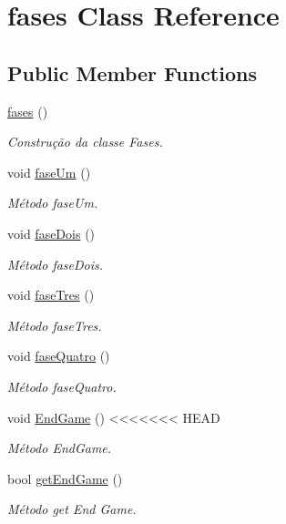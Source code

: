 \hypertarget{classfases}{}\section{fases Class Reference}
\label{classfases}
\subsection*{Public Member Functions}
\begin{DoxyCompactItemize}
\item 
\mbox{\hyperlink{classfases_a39d5b42a40a958d25411c51cb2b0959c}{fases}} ()
\begin{DoxyCompactList}\small\item\em Construção da classe Fases. \end{DoxyCompactList}\item 
void \mbox{\hyperlink{classfases_a89059232b76460277f9846fc6d66488c}{fase\+Um}} ()
\begin{DoxyCompactList}\small\item\em Método fase\+Um. \end{DoxyCompactList}\item 
void \mbox{\hyperlink{classfases_a2f19632bd94eacd6c5437a2774bc529f}{fase\+Dois}} ()
\begin{DoxyCompactList}\small\item\em Método fase\+Dois. \end{DoxyCompactList}\item 
void \mbox{\hyperlink{classfases_a05138769008d5c7d1b548916ecfa9f34}{fase\+Tres}} ()
\begin{DoxyCompactList}\small\item\em Método fase\+Tres. \end{DoxyCompactList}\item 
void \mbox{\hyperlink{classfases_af33d3aefdf442b1ea726645b0c946d78}{fase\+Quatro}} ()
\begin{DoxyCompactList}\small\item\em Método fase\+Quatro. \end{DoxyCompactList}\item 
void \mbox{\hyperlink{classfases_aa05ea0c25d2c70ee022f56f02003b4b5}{End\+Game}} ()
<<<<<<< HEAD
\begin{DoxyCompactList}\small\item\em Método End\+Game. \end{DoxyCompactList}\item 
bool \mbox{\hyperlink{classfases_aedbb30c3e8ad0b50e96561029aecdf4a}{get\+End\+Game}} ()
\begin{DoxyCompactList}\small\item\em Método get End Game. \end{DoxyCompactList}\end{DoxyCompactItemize}
